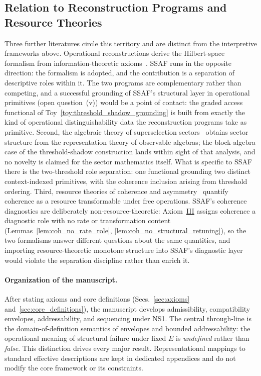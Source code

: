 \documentclass[aps,prx,onecolumn,11pt]{revtex4-2}
\theoremstyle{plain}
\theoremstyle{definition}
\theoremstyle{remark}
\begin{document}
\subsection{Relation to Reconstruction Programs and Resource Theories}
\label{subsec:reconstruction_relation}

Three further literatures circle this territory and are distinct from
the interpretive frameworks above. Operational reconstructions derive
the Hilbert-space formalism from information-theoretic
axioms~\cite{Hardy2001,Chiribella2010,ChiribellaDArianoPerinotti2011,MasanesMuller2011}.
SSAF runs in the opposite direction: the formalism is adopted, and the
contribution is a separation of descriptive roles within it. The two
programs are complementary rather than competing, and a successful
grounding of SSAF's structural layer in operational primitives (open
question~(v)) would be a point of contact: the graded access functional
of Toy~\ref{toy:threshold_shadow_grounding} is built from exactly the
kind of operational distinguishability data the reconstruction programs
take as primitive. Second, the algebraic theory of superselection
sectors~\cite{DHR1971} obtains sector structure from the representation
theory of observable algebras; the block-algebra case of the
threshold-shadow construction lands within sight of that analysis, and
no novelty is claimed for the sector mathematics itself. What is
specific to SSAF there is the two-threshold role separation: one
functional grounding two distinct context-indexed primitives, with the
coherence inclusion arising from threshold ordering. Third, resource
theories of coherence and
asymmetry~\cite{Baumgratz2014,StreltsovAdessoPlenio2017,
MarvianSpekkens2016} quantify coherence as a resource transformable
under free operations. SSAF's coherence diagnostics are deliberately
non-resource-theoretic: Axiom~\hyperref[ax:coherence_diagnostics]{III}
assigns coherence a diagnostic role with no rate or transformation
content
(Lemmas~\ref{lem:coh_no_rate_role},
\ref{lem:coh_no_structural_retuning}), so the two formalisms answer
different questions about the same quantities, and importing
resource-theoretic monotone structure into SSAF's diagnostic layer
would violate the separation discipline rather than enrich it.


\paragraph{Organization of the manuscript.}
After stating axioms and core definitions
(Secs.~\ref{sec:axioms} and~\ref{sec:core_definitions}), the manuscript
develops admissibility, compatibility envelopes, addressability, and sequencing
under NS1. The central through-line is the domain-of-definition semantics of
envelopes and bounded addressability: the operational meaning of structural
failure under fixed $E$ is \emph{undefined} rather than \emph{false}. This
distinction drives every major result. Representational mappings to standard
effective descriptions are kept in dedicated appendices and do not modify the
core framework or its constraints.
\end{document}
